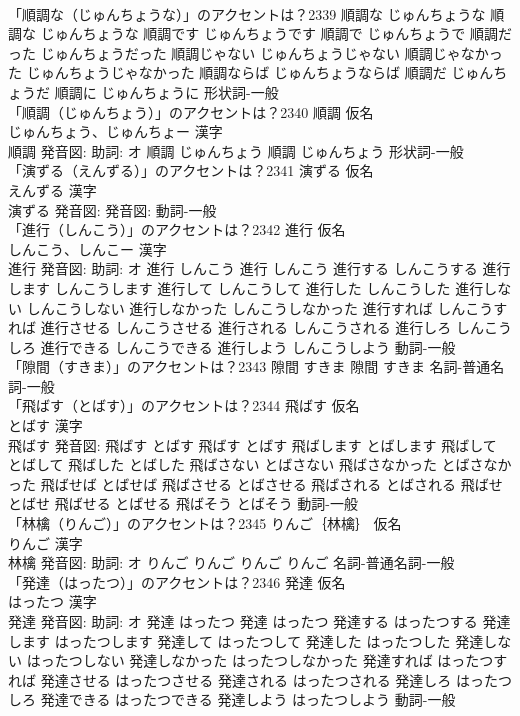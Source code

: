 \documentclass[8pt]{extreport}
\begin{document}
\begin{CJK}{UTF8}{min}
\\	「順調な（じゅんちょうな）」のアクセントは？2339		順調な じゅんちょうな		順調な じゅんちょうな 順調です じゅんちょうです 順調で じゅんちょうで 順調だった じゅんちょうだった 順調じゃない じゅんちょうじゃない 順調じゃなかった じゅんちょうじゃなかった 順調ならば じゅんちょうならば 順調だ じゅんちょうだ 順調に じゅんちょうに				形状詞-一般 
\\	「順調（じゅんちょう）」のアクセントは？2340	順調 仮名　
\\	じゅんちょう、じゅんちょー 漢字　
\\	順調 発音図: 助詞: オ	順調 じゅんちょう		順調 じゅんちょう				形状詞-一般 
\\	「演ずる（えんずる）」のアクセントは？2341	演ずる 仮名　
\\	えんずる 漢字　
\\	演ずる 発音図: 発音図:							動詞-一般 
\\	「進行（しんこう）」のアクセントは？2342	進行 仮名　
\\	しんこう、しんこー 漢字　
\\	進行 発音図: 助詞: オ	進行 しんこう		進行 しんこう 進行する しんこうする 進行します しんこうします 進行して しんこうして 進行した しんこうした 進行しない しんこうしない 進行しなかった しんこうしなかった 進行すれば しんこうすれば 進行させる しんこうさせる 進行される しんこうされる 進行しろ しんこうしろ 進行できる しんこうできる 進行しよう しんこうしよう				動詞-一般 
\\	「隙間（すきま）」のアクセントは？2343		隙間 すきま		隙間 すきま				名詞-普通名詞-一般 
\\	「飛ばす（とばす）」のアクセントは？2344	飛ばす 仮名　
\\	とばす 漢字　
\\	飛ばす 発音図:	飛ばす とばす		飛ばす とばす 飛ばします とばします 飛ばして とばして 飛ばした とばした 飛ばさない とばさない 飛ばさなかった とばさなかった 飛ばせば とばせば 飛ばさせる とばさせる 飛ばされる とばされる 飛ばせ とばせ 飛ばせる とばせる 飛ばそう とばそう				動詞-一般 
\\	「林檎（りんご）」のアクセントは？2345	りんご｛林檎｝ 仮名　
\\	りんご 漢字　
\\	林檎 発音図: 助詞: オ	りんご りんご		りんご りんご				名詞-普通名詞-一般 
\\	「発達（はったつ）」のアクセントは？2346	発達 仮名　
\\	はったつ 漢字　
\\	発達 発音図: 助詞: オ	発達 はったつ		発達 はったつ 発達する はったつする 発達します はったつします 発達して はったつして 発達した はったつした 発達しない はったつしない 発達しなかった はったつしなかった 発達すれば はったつすれば 発達させる はったつさせる 発達される はったつされる 発達しろ はったつしろ 発達できる はったつできる 発達しよう はったつしよう				動詞-一般 

\end{CJK}
\end{document}
